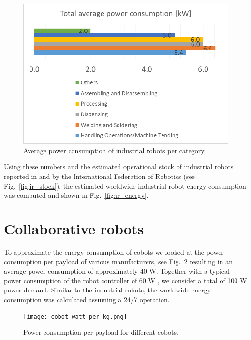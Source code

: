 \begin{appendices}
\begin{figure}[h]
	\centering
	\includegraphics[width=0.95\columnwidth]{fig/industrial_robots_average_power_per_category}
	\caption{Average power consumption of industrial robots per category.}
	\label{fig:ir_average_power}
\end{figure}
Using these numbers and the estimated operational stock of industrial robots reported in \cite{statista_ir_operational_stock} and by the International Federation of Robotics (see Fig.~\ref{fig:ir_stock}), the estimated worldwide industrial robot energy consumption was computed and shown in Fig.~\ref{fig:ir_energy}.
\section{Collaborative robots}\label{sec:app_cobot_ener_consumption}
To approximate the energy consumption of cobots we looked at the power consumption per payload of various manufacturers, see Fig.~\ref{fig:cobot_watt_per_kg} resulting in an average power consumption of approximately 40 W. Together with a typical power consumption of the robot controller of 60 W \cite{Heredia2023BreakingEnergyConsumption}, we consider a total of 100 W power demand. Similar to the industrial robots, the worldwide energy consumption was calculated assuming a 24/7 operation.
\begin{figure}[h]
	\centering
	\texttt{[image: cobot\_watt\_per\_kg.png]}
	\caption{Power consumption per payload for different cobots.}
	\label{fig:cobot_watt_per_kg}
\end{figure}

\end{appendices}


